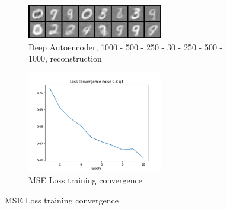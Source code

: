           \begin{figure}[!htbp]
          \begin{subfigure}
          \centering
          \includegraphics[angle=0,width=0.65\textwidth]{assign-4/logs/q4/deep_autoencoder_noise_0.8/image_5.png}
          \caption{Deep Autoencoder, 1000 - 500 - 250 - 30 - 250 - 500 - 1000, reconstruction}
          \end{subfigure}
          \begin{subfigure}
          \centering
          \includegraphics[angle=0,width=0.65\textwidth]{assign-4/logs/q4/convergence-noise-0.8.png}
          \caption{MSE Loss training convergence}
          \end{subfigure}
          \end{figure}
          
